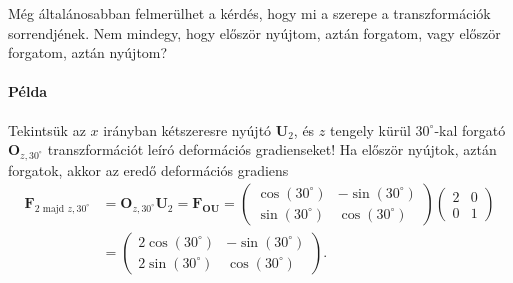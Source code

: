 \documentclass[12pt,a4paper]{scrartcl}
\let\mathbf\bm
\begin{document}
Még általánosabban felmerülhet a kérdés, hogy mi a szerepe a transzformációk sorrendjének. Nem mindegy, hogy először nyújtom, aztán forgatom, vagy először forgatom, aztán nyújtom?

\footnotesize
\paragraph{Példa}
Tekintsük az $x$ irányban kétszeresre nyújtó ${{\mathbf{U}}_2}$, és $z$ tengely kürül $30^\circ$-kal forgató ${{\mathbf{O}}_{z,30^\circ }}$ transzformációt leíró deformációs gradienseket! Ha először nyújtok, aztán forgatok, akkor az eredő deformációs gradiens
\[\begin{aligned}
  {{\mathbf{F}}_{2{\text{ majd }}z,30^\circ }} &  = {{\mathbf{O}}_{z,30^\circ }}{{\mathbf{U}}_2} =  {{\mathbf{F}}_{{\mathbf{OU}}}} = \left( {\begin{array}{*{20}{c}}
  {\cos \left( {30^\circ } \right)}&{ - \sin \left( {30^\circ } \right)} \\ 
  {\sin \left( {30^\circ } \right)}&{\cos \left( {30^\circ } \right)} 
\end{array}} \right)\left( {\begin{array}{*{20}{c}}
  2&0 \\ 
  0&1 
\end{array}} \right) \\ 
   &  = \left( {\begin{array}{*{20}{c}}
  {2\cos \left( {30^\circ } \right)}&{ - \sin \left( {30^\circ } \right)} \\ 
  {2\sin \left( {30^\circ } \right)}&{\cos \left( {30^\circ } \right)} 
\end{array}} \right). \\ 
\end{aligned} \]
\end{document}
